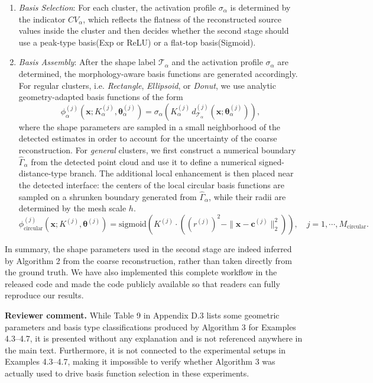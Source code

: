 \documentclass[11pt]{article}
\newcommand{\reviewer}[1]{\vspace{0.4em}\noindent\textbf{Reviewer comment.} #1}
\begin{document}
{\begin{enumerate}
     or \emph{general}. It then outputs the corresponding parameters, such as the center $\boldsymbol{c}_\alpha$ and the length-scale parameters $\boldsymbol{L}_\alpha$ (or the major/minor radius for the donut branch).
    \item \textit{Basis Selection}: For each cluster, the activation profile $\sigma_\alpha$ is determined by the indicator $CV_\alpha$, which reflects the flatness of the reconstructed source values inside the cluster and then decides whether the second stage should use a peak-type basis(Exp or ReLU) or a flat-top basis(Sigmoid).
    \item \textit{Basis Assembly}: After the shape label $\mathcal{T}_\alpha$ and the activation profile $\sigma_\alpha$ are determined, the morphology-aware basis functions are generated accordingly. For regular clusters, i.e. \emph{Rectangle}, \emph{Ellipsoid}, or \emph{Donut}, we use analytic geometry-adapted basis functions of the form
    \[
    \phi_\alpha^{(j)}(\boldsymbol{x};K_\alpha^{(j)},\boldsymbol{\theta}_\alpha^{(j)})
    =
    \sigma_\alpha\!\left(K_\alpha^{(j)}\, d_{\mathcal{T}_\alpha}^{(j)}(\boldsymbol{x};\boldsymbol{\theta}_\alpha^{(j)})\right),
    \]
    where the shape parameters are sampled in a small neighborhood of the detected estimates in order to account for the uncertainty of the coarse reconstruction.
     For \emph{general} clusters, we first construct a numerical boundary $\hat{\Gamma}_\alpha$ from the detected point cloud and use it to define a numerical signed-distance-type branch. The additional local enhancement is then placed near the detected interface: 
     the centers of the local circular basis functions are sampled on a shrunken boundary generated from $\hat{\Gamma}_\alpha$, while their radii are determined by the mesh scale $h$.
     $$
\phi^{(j)}_{\mathrm{circular}}(\boldsymbol{x};K^{(j)},\boldsymbol{\theta}^{(j)})
=\mathrm{sigmoid}\!\left(
K^{(j)}\cdot\left((r^{(j)})^2-\|\boldsymbol{x}-\boldsymbol{c}^{(j)}\|_2^2\right)
\right), \quad j=1,\cdots,M_{\mathrm{circular}}.
$$
\end{enumerate}
In summary, the shape parameters used in the second stage are indeed inferred by Algorithm 2 from the coarse reconstruction, rather than taken directly from the ground truth. We have also implemented this complete workflow in the released code and made the code publicly available so that readers can fully reproduce our results.
}

\reviewer{While Table 9 in Appendix D.3 lists some geometric parameters and basis type classifications produced by Algorithm 3 for Examples
4.3–4.7, it is presented without any explanation and is not referenced anywhere
in the main text. Furthermore, it is not connected to the experimental setups
in Examples 4.3–4.7, making it impossible to verify whether Algorithm 3 was
actually used to drive basis function selection in these experiments.}
\end{document}

